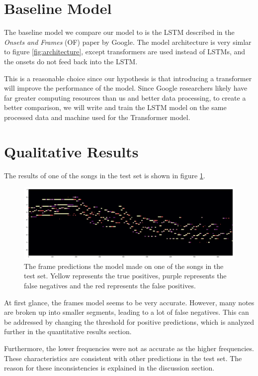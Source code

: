 \documentclass[a4paper,twocolumn,10pt]{article}
\begin{document}
\section{Baseline Model}
The baseline model we compare our model to is the LSTM described in the \textit{Onsets and Frames} (OF) paper by Google\cite{onsets_and_frames}. The model architecture is very simlar to figure \ref{fig:architecture}, except transformers are used instead of LSTMs, and the onsets do not feed back into the LSTM.

This is a reasonable choice since our hypothesis is that introducing a transformer will improve the performance of the model. Since Google researchers likely have far greater computing resources than us and better data processing, to create a better comparison, we will write and train the LSTM model on the same processed data and machine used for the Transformer model.  

\section{Qualitative Results}
The results of one of the songs in the test set is shown in figure \ref{fig:results}.
\begin{figure}
  \centering
  \includegraphics[width=\linewidth]{figures/results.png}
  \caption{The frame predictions the model made on one of the songs in the test set. Yellow represents the true positives, purple represents the false negatives and the red represents the false positives.}
  \label{fig:results}
\end{figure}
At first glance, the frames model seems to be very accurate. However, many notes are broken up into smaller segments, leading to a lot of false negatives. This can be addressed by changing the threshold for positive predictions, which is analyzed further in the quantitative results section.

Furthermore, the lower frequencies were not as accurate as the higher frequencies. These characteristics are consistent with other predictions in the test set. The reason for these inconsistencies is explained in the discussion section.
\end{document}
